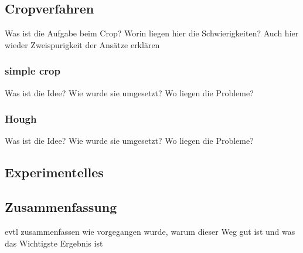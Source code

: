 \subsection{Cropverfahren}

Was ist die Aufgabe beim Crop?
Worin liegen hier die Schwierigkeiten?
Auch hier wieder Zweispurigkeit der Ansätze erklären

\subsubsection{simple crop}

Was ist die Idee?
Wie wurde sie umgesetzt?
Wo liegen die Probleme?

\subsubsection{Hough}

Was ist die Idee?
Wie wurde sie umgesetzt?
Wo liegen die Probleme?

\subsection{Experimentelles}

\subsection{Zusammenfassung}
evtl zusammenfassen wie vorgegangen wurde, warum dieser Weg gut ist und was das Wichtigste Ergebnis ist